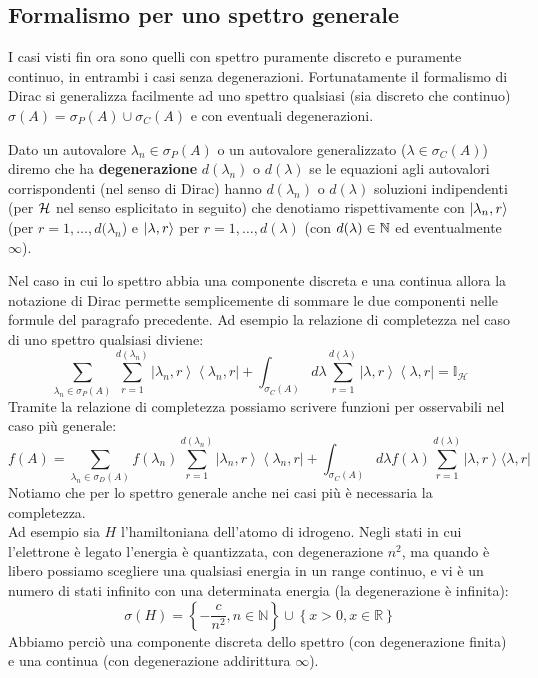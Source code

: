 \documentclass[../../FisicaTeorica.tex]{subfiles}
\begin{document}
\subsection{Formalismo per uno spettro generale}
I casi visti fin ora sono quelli con spettro puramente discreto e puramente continuo, in entrambi i casi senza degenerazioni. Fortunatamente il formalismo di Dirac si generalizza facilmente ad uno spettro qualsiasi (sia discreto che continuo) $\sigma \left(A\right)= \sigma_P(A)\cup \sigma_C\left(A\right)$ e con eventuali degenerazioni.\\
\begin{dfn}[degenerazione]
Dato un autovalore $\lambda_n\in \sigma_P(A)$ o un autovalore generalizzato ($\lambda \in \sigma_C(A)$) diremo che ha \textbf{degenerazione} $d(\lambda_n)$ o $d\left(\lambda\right)$ se le equazioni agli autovalori corrispondenti (nel senso di Dirac) hanno $d\left(\lambda_n\right)$ o $d\left(\lambda\right)$ soluzioni indipendenti (per $\mathcal{H}$ nel senso esplicitato in seguito) che denotiamo rispettivamente con $\Ket{\lambda_{n}, r}$ (per $r=1,\dots, d(\lambda_n$) e $\Ket{\lambda, r}$ per $r = 1,\dots, d(\lambda)$ (con $d(\lambda) \in \mathbb{N}$ ed eventualmente $\infty$).
\end{dfn}
Nel caso in cui lo spettro abbia una componente discreta e una continua allora la notazione di Dirac permette semplicemente di sommare le due componenti nelle formule del paragrafo precedente.
Ad esempio la relazione di completezza nel caso di uno spettro qualsiasi diviene:
\[
\sum_{\lambda_n\in\sigma_P\left(A\right)}\sum_{r=1}^{d\left(\lambda_n\right)}{\left|\lambda_n,r\right\rangle\left\langle\lambda_n,r\right|+\int_{\sigma_C\left(A\right)}d\lambda\sum_{r=1}^{d\left(\lambda\right)}\left|\lambda,r\right\rangle\left\langle\lambda,r\right|=\mathbb{I}_\mathcal{H}}
\]
Tramite la relazione di completezza possiamo scrivere funzioni per osservabili nel caso più generale:
\[
f\left(A\right)= \sum_{\lambda_n\in\sigma_D\left(A\right)} f\left(\lambda_n\right)\sum_{r=1}^{d\left(\lambda_n\right)}\left|\lambda_n,r\right\rangle\left\langle\lambda_n,r\right|+\int_{\sigma_C\left(A\right)}{d\lambda f\left(\lambda\right)}\sum_{r=1}^{d\left(\lambda\right)}{\left|\lambda,r\right\rangle\langle\lambda,r|}
\]
Notiamo che per lo spettro generale anche nei casi più  è necessaria la completezza.\\

Ad esempio sia $H$ l'hamiltoniana dell'atomo di idrogeno. Negli stati in cui l'elettrone è legato l'energia è quantizzata, con degenerazione $n^2$, ma quando è libero possiamo scegliere una qualsiasi energia in un range continuo, e vi è un numero di stati infinito con una determinata energia (la degenerazione è infinita):
\[
\sigma \left(H\right)=\left\{-\frac{c}{n^2},n\in\mathbb{N}\right\}\cup \left\{x>0,x\in\mathbb{R}\right\}
\]
Abbiamo perciò una componente discreta dello spettro (con degenerazione finita) e una continua (con degenerazione addirittura $\infty$).
\end{document}
